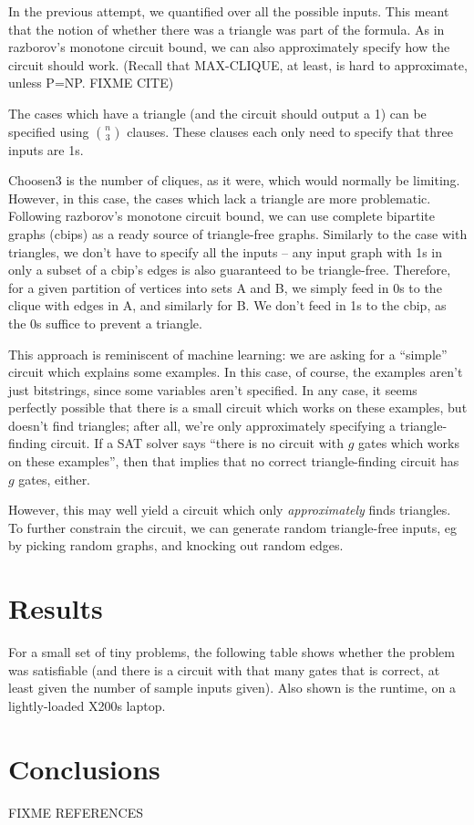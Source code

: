 \documentclass[12pt]{article}
\begin{document}
In the previous attempt, we quantified over all the possible inputs. This meant that the notion of
whether there was a triangle was part of the formula. As in razborov’s monotone circuit bound, we
can also approximately specify how the circuit should work. (Recall that MAX-CLIQUE, at least, is
hard to approximate, unless P=NP. FIXME CITE)

The cases which have a triangle (and the circuit should output a 1) can be specified using
$n \choose 3$ clauses. These clauses each only need to specify that three inputs are 1s.

Choosen3 is the number of cliques, as it were, which would normally be limiting.
However, in this case, the cases which lack a triangle are more problematic. Following razborov's monotone circuit bound, we can use complete bipartite graphs (cbips) as a ready source of triangle-free graphs. Similarly to the case with triangles, we don’t have to specify all the inputs -- any input graph with 1s in only a subset of a cbip’s edges is also guaranteed to be triangle-free. Therefore, for a given partition of vertices into sets A and B, we simply feed in 0s to the clique with edges in A, and similarly for B. We don’t feed in 1s to the cbip, as the 0s suffice to prevent a triangle.

This approach is reminiscent of machine learning: we are asking for a ``simple'' circuit which explains some examples. In this case, of course, the examples aren’t just bitstrings, since some variables aren’t specified. In any case, it seems perfectly possible that there is a small circuit which works on these examples, but doesn’t find triangles; after all, we’re only approximately specifying a triangle-finding circuit. If a SAT solver says ``there is no circuit with $g$ gates which works on these examples'', then that implies that no correct triangle-finding circuit has $g$ gates, either.

However, this may well yield a circuit which only {\em approximately} finds triangles.
To further constrain the circuit, we can generate random triangle-free inputs, eg by picking random graphs, and knocking out random edges.


\section{Results}

For a small set of tiny problems, the following table shows whether the problem was satisfiable
(and there is a circuit with that many gates that is correct, at least given the number of
sample inputs given). Also shown is the runtime, on a
lightly-loaded X200s laptop.


\section{Conclusions}





FIXME REFERENCES
\end{document}
